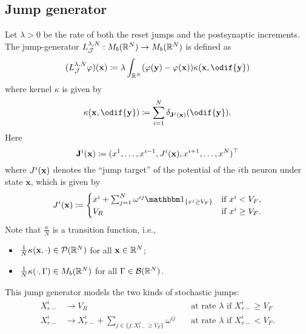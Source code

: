 \subsection{Jump generator}
Let \(\lambda > 0\) be the rate of both the reset jumps and the postsynaptic increments.
The jump-generator \(L_{\mathcal{J}}^{\lambda, N} : M_b(\mathbb{R}^N) \to M_b(\mathbb{R}^N)\) is defined as
\begin{equation}
  (L_{\cJ}^{\lambda, N}\varphi) (\bm{x}) \coloneqq \lambda \int_{\potspace^N} \br{\varphi(\bm{y}) - \varphi(\bm{x})} \kappa(\bm{x}, \odif{\bm{y}})
\end{equation}
where kernel \(\kappa\) is given by
\begin{equation}
  \kappa(\bm{x},\odif{\bm{y}}) \coloneqq \sum_{i=1}^N \delta_{\bm{\jtarg}^i(\bm{x})}(\odif{\bm{y}}).
\end{equation}
Here
\begin{equation}
  \mathbf{J}^i(\mathbf{x}) \coloneqq (x^1,\dots,x^{i-1},J^i(\mathbf{x}),x^{i+1},\dots,x^N)^\top
\end{equation}
where \(J^i(\mathbf{x})\) denotes the \enquote{jump target} of the potential of the \(i\)th neuron under state \(\bm{x}\), which is given by
\begin{equation}
  \jtarg^i(\bm{x})
  \coloneqq \begin{cases}
    x^i + \sum_{j=1}^N \omega^{ij} \ind{x^j \geq V_F} & \text{if } x^i < V_F,    \\
    V_R                                               & \text{if } x^i \geq V_F.
  \end{cases}
\end{equation}
Note that \(\frac{\kappa}{N}\) is a transition function, i.e.,
\begin{itemize}
  \item \(\frac{1}{N} \kappa(\mathbf{x},\cdot) \in \mathcal{P}(\mathbb{R}^N)\) for all \(\mathbf{x} \in \mathbb{R}^N\);
  \item \(\frac{1}{N} \kappa(\cdot, \Gamma) \in M_b(\mathbb{R}^N)\) for all \(\Gamma \in \mathcal{B}(\mathbb{R}^N)\).
\end{itemize}

\smallskip

This jump generator models the two kinds of stochastic jumps:
\begin{align}
  X_{r-}^i & \to V_R                                                           & \quad\text{at rate } \lambda \text{ if } X_{r-}^i \geq V_F \\
  X_{r-}^i & \to X_{r-}^i + \sum_{j \in \{j : X_{r-}^j \geq V_F\}} \omega^{ij} & \quad\text{at rate } \lambda \text{ if } X_{r-}^i < V_F.
\end{align}


